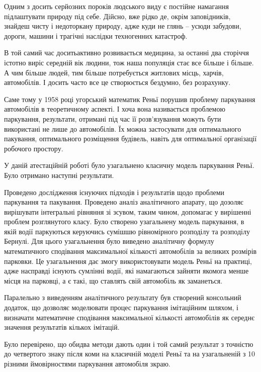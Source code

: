 
Одним з досить серйозних пороків людського виду є постійне намагання підлаштувати природу під себе. Дійсно, вже рідко де, окрім заповідників, знайдеш чисту і недоторкану природу, адже куди не глянь – усюди забудови, дороги, машини і трагічні наслідки техногенних катастроф.

В той самий час доситьактивно розвивається медицина, за останні два сторіччя істотно виріс середній вік людини, тож наша популяція стає все більше і більше. А чим більше людей, тим більше потребується житлових місць, харчів, автомобілів. І досить часто все це створюється бездумно, без розрахунку.

Саме тому у 1958 році угорський математик Реньї порушив проблему паркування автомобілів в теоретичному аспекті. І хоча вона називається проблемою паркування, результати, отримані під час її розв'язування можуть бути використані не лише до автомобілів. Їх можна застосувати для оптимального пакування, оптимального розміщення будівель, навіть для оптимальної організації робочого простору.

У даній атестаційній роботі було узагальнено класичну модель паркування Реньї. Було отримано наступні результати.

Проведено дослідження існуючих підходів і результатів щодо проблеми паркування та пакування. Проведено аналіз аналітичного апарату, що дозоляє вирішувати інтегральні рівняння зі зсувом, таким чином, допомагає у вирішенні проблем розглянутого класу. Було створено узагальнену модель паркування, в якій водії паркуються керуючись сумішшю рівномірного розподілу та розподілу Бернулі. Для цього узагальнення було виведено аналітичну формулу математичного сподівання максимальної кількості автомобілів за великих розмірів парковки. Це узагальнення дає змогу використовувати модель Реньї на практиці, адже насправді існують сумлінні водії, які намагаються зайняти якомога менше місця на парковці, а є такі, що ставлять свій автомобіль як заманеться.

Паралельно з виведенням аналітичного результату був створений консольний додаток, що дозволяє моделювати процес паркування імітаційним шляхом, і визначати математичне сподівання максимальної кількості автомобілів як середнє значення результатів кількох імітацій.

Було перевірено, що обидва методи дають один і той самий результат з точністю до четвертого знаку після коми на класичній моделі Реньї та на узагальненій з 10 різними ймовірностями паркування автомобіля зкраю.

